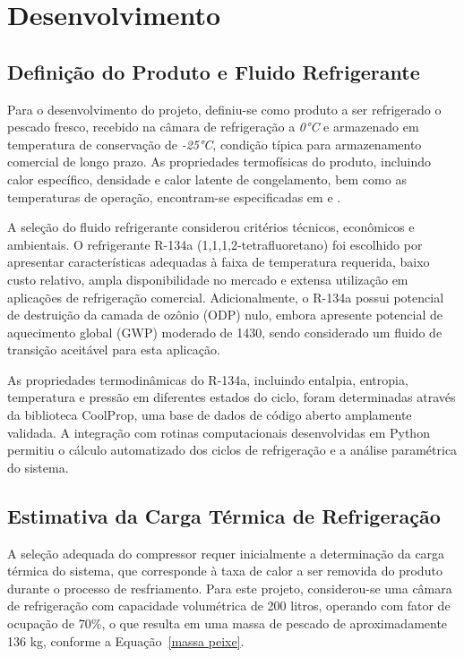 \chapter{Desenvolvimento}

\section{Definição do Produto e Fluido Refrigerante}

Para o desenvolvimento do projeto, definiu-se como produto a ser refrigerado o pescado fresco, recebido na câmara de refrigeração a \textit{0°C} e armazenado em temperatura de conservação de \textit{-25°C}, condição típica para armazenamento comercial de longo prazo. As propriedades termofísicas do produto, incluindo calor específico, densidade e calor latente de congelamento, bem como as temperaturas de operação, encontram-se especificadas em \cite{calor_especifico_II} e \cite{costa1982refrigeracao}.

A seleção do fluido refrigerante considerou critérios técnicos, econômicos e ambientais. O refrigerante R-134a (1,1,1,2-tetrafluoretano) foi escolhido por apresentar características adequadas à faixa de temperatura requerida, baixo custo relativo, ampla disponibilidade no mercado e extensa utilização em aplicações de refrigeração comercial. Adicionalmente, o R-134a possui potencial de destruição da camada de ozônio (ODP) nulo, embora apresente potencial de aquecimento global (GWP) moderado de 1430, sendo considerado um fluido de transição aceitável para esta aplicação.

As propriedades termodinâmicas do R-134a, incluindo entalpia, entropia, temperatura e pressão em diferentes estados do ciclo, foram determinadas através da biblioteca CoolProp, uma base de dados de código aberto amplamente validada. A integração com rotinas computacionais desenvolvidas em Python permitiu o cálculo automatizado dos ciclos de refrigeração e a análise paramétrica do sistema.

\section{Estimativa da Carga Térmica de Refrigeração}

A seleção adequada do compressor requer inicialmente a determinação da carga térmica do sistema, que corresponde à taxa de calor a ser removida do produto durante o processo de resfriamento. Para este projeto, considerou-se uma câmara de refrigeração com capacidade volumétrica de 200 litros, operando com fator de ocupação de 70\%, o que resulta em uma massa de pescado de aproximadamente 136 kg, conforme a Equação~\ref{massa peixe}.

